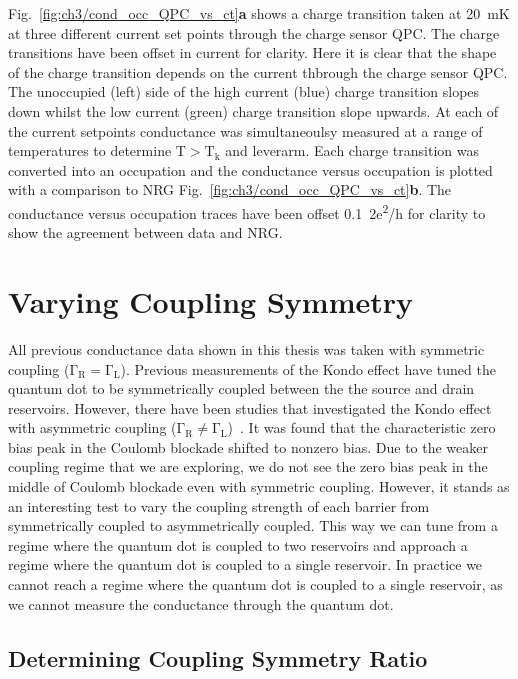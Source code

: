 Fig.~\ref{fig:ch3/cond_occ_QPC_vs_ct}\textbf{a} shows a charge transition taken at \qty{20}{mK} at three different current set points through the charge sensor QPC. The charge transitions have been offset in current for clarity. Here it is clear that the shape of the charge transition depends on the current thbrough the charge sensor QPC. The unoccupied (left) side of the high current (blue) charge transition slopes down whilst the low current (green) charge transition slope upwards. At each of the current setpoints conductance was simultaneoulsy measured at a range of temperatures to determine $\mathrm{T>T_k}$ and leverarm. Each charge transition was converted into an occupation and the conductance versus occupation is plotted with a comparison to NRG Fig.~\ref{fig:ch3/cond_occ_QPC_vs_ct}\textbf{b}. The conductance versus occupation traces have been offset \qty{0.1}{2e^2/h} for clarity to show the agreement between data and NRG. 


\afterpage{\clearpage}
\section{Varying Coupling Symmetry}

All previous conductance data shown in this thesis was taken with symmetric coupling ($\mathrm{\Gamma_R = \Gamma_L}$). Previous measurements of the Kondo effect have tuned the quantum dot to be symmetrically coupled between the the source and drain reservoirs. However, there have been studies that investigated the Kondo effect with asymmetric coupling ($\mathrm{\Gamma_R \neq \Gamma_L}$)~\cite{kondo_asymmetric}. It was found that the characteristic zero bias peak in the Coulomb blockade shifted to nonzero bias. Due to the weaker coupling regime that we are exploring, we do not see the zero bias peak in the middle of Coulomb blockade even with symmetric coupling. However, it stands as an interesting test to vary the coupling strength of each barrier from symmetrically coupled to asymmetrically coupled. This way we can tune from a regime where the quantum dot is coupled to two reservoirs and approach a regime where the quantum dot is coupled to a single reservoir. In practice we cannot reach a regime where the quantum dot is coupled to a single reservoir, as we cannot measure the conductance through the quantum dot. 


\afterpage{\clearpage}
\subsection{Determining Coupling Symmetry Ratio}

